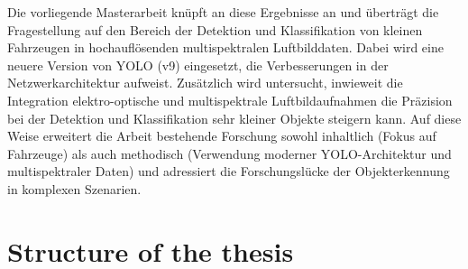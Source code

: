 Die vorliegende Masterarbeit knüpft an diese Ergebnisse an und überträgt die Fragestellung auf den Bereich der Detektion und Klassifikation von kleinen Fahrzeugen in hochauflösenden multispektralen Luftbilddaten. Dabei wird eine neuere Version von \acrfull{YOLO} (v9) eingesetzt, die Verbesserungen in der Netzwerkarchitektur aufweist. Zusätzlich wird untersucht, inwieweit die Integration elektro-optische und multispektrale Luftbildaufnahmen  die Präzision bei der Detektion und Klassifikation sehr kleiner Objekte steigern kann. Auf diese Weise erweitert die Arbeit bestehende Forschung sowohl inhaltlich (Fokus auf Fahrzeuge) als auch methodisch (Verwendung moderner YOLO-Architektur und multispektraler Daten) und adressiert die Forschungslücke der Objekterkennung in komplexen Szenarien.



\section{Structure of the thesis}